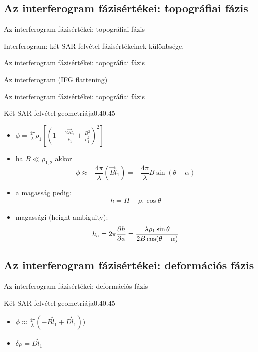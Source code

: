\documentclass[aspectratio=169]{beamer}
\begin{document}
\def\ft{Az interferogram fázisértékei: topográfiai fázis}
\subsection{\ft}


\begin{frame}{\ft}
    \begin{minic}{0.55}
        \centering
        
        Interferogram: két SAR felvétel fázisértékeinek különbsége.
    \end{minic}
\end{frame}


\begin{frame}{\ft}
    \begin{minic}{0.6}
        \centering
        
        Az interferogram  (IFG flattening)
    \end{minic}
\end{frame}


\begin{frame}{\ft}
    \begin{figp}{}{Két SAR felvétel geometriája}{0.4}{0.45}
        \begin{itemize}
            \item $\phi = \frac{4\pi}{\lambda}\rho_1\left[\left(1 - \frac{2 \vec{B}\hat{l}_1}{\rho_1} + \frac{B^2}{\rho_1^2}\right)^2\right]$
            \item ha $B \ll \rho_{1,2}$ akkor $$\phi \approx - \frac{4\pi}{\lambda} (\vec{B}\hat{l}_1) = - \frac{4\pi}{\lambda} B \sin(\theta - \alpha)$$
            \item a magasság pedig: $$h = H - \rho_1 \cos\theta$$
            \item magassági  (height ambiguity): $$h_{\text{a}} = 2\pi \frac{\partial h}{\partial \phi} = \frac{\lambda\rho_1\sin\theta}{2B\cos(\theta - \alpha)}$$
        \end{itemize}
    \end{figp}
\end{frame}


\def\ft{Az interferogram fázisértékei: deformációs fázis}
\subsection{\ft}

\begin{frame}{\ft}
    \begin{figp}{}{Két SAR felvétel geometriája}{0.4}{0.45}
        \begin{itemize}
            \item $\phi \approx \frac{4\pi}{\lambda} (- \vec{B}\hat{l}_1 + \vec{D}\hat{l}_1))$
            \item $\delta\rho = \vec{D}\hat{l}_1$
        \end{itemize}
    \end{figp}
\end{frame}
\end{document}
